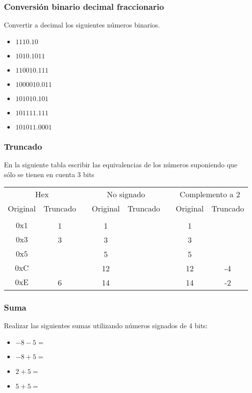 \subsubsection{Conversión binario decimal fraccionario}
Convertir a decimal los siguientes números binarios.
\begin{itemize}
  \item $\mathrm{1110.10}$
  \item $\mathrm{1010.1011}$
  \item $\mathrm{110010.111}$
  \item $\mathrm{1000010.011}$
  \item $\mathrm{101010.101}$
  \item $\mathrm{101111.111}$
  \item $\mathrm{101011.0001}$
\end{itemize}

\subsubsection{Truncado}
En la siguiente tabla escribir las equivalencias de los números suponiendo que sólo se tienen en cuenta 3 bits\\

\begin{tabular}{cccccccc}
  \multicolumn{2}{c}{Hex} & &\multicolumn{2}{c}{No signado}& &\multicolumn{2}{c}{Complemento a 2}\\
  Original&Truncado&&Original&Truncado&&Original&Truncado\\
  \cline{1-2}\cline{4-5}\cline{7-8}\\
  $\mathrm{0x1}$&1          &&1  &\underspace&&1 & \underspace \\
  $\mathrm{0x3}$&3          &&3  &\underspace&&3 & \underspace \\
  $\mathrm{0x5}$&\underspace&&5  &\underspace&&5 & \underspace \\
  $\mathrm{0xC}$&\underspace&&12 &\underspace&&12& -4\\
  $\mathrm{0xE}$&6          &&14 &\underspace&&14& -2\\
\end{tabular}

\subsubsection{Suma}
Realizar las siguientes sumas utilizando números signados de 4 bits:
\begin{itemize}
  \item $ -8-5= $
  \item $-8+5 = $
  \item $2+5  = $
  \item $5+5  = $
\end{itemize}

